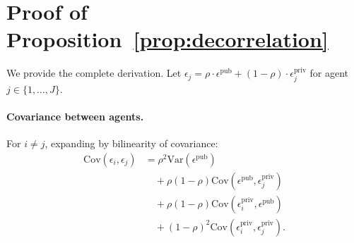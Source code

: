 \documentclass[11pt]{article}
\theoremstyle{plain}
\theoremstyle{definition}
\begin{document}


\section{Proof of Proposition~\ref{prop:decorrelation}}
\label{sec:appendix_proof}

We provide the complete derivation.
Let $\epsilon_j = \rho \cdot \epsilon^{\mathrm{pub}} + (1 - \rho) \cdot
\epsilon_j^{\mathrm{priv}}$ for agent $j \in \{1, \dots, J\}$.

\paragraph{Covariance between agents.}
For $i \neq j$, expanding by bilinearity of covariance:
  \begin{align}
  \mathrm{Cov}(\epsilon_i, \epsilon_j)
    &= \rho^2 \mathrm{Var}(\epsilon^{\mathrm{pub}}) \nonumber\\
    &\quad + \rho(1{-}\rho)\mathrm{Cov}(\epsilon^{\mathrm{pub}}, \epsilon_j^{\mathrm{priv}}) \nonumber\\
    &\quad + \rho(1{-}\rho)\mathrm{Cov}(\epsilon_i^{\mathrm{priv}}, \epsilon^{\mathrm{pub}}) \nonumber\\
    &\quad + (1{-}\rho)^2\mathrm{Cov}(\epsilon_i^{\mathrm{priv}}, \epsilon_j^{\mathrm{priv}}).
  \end{align} %
  
\end{document}
